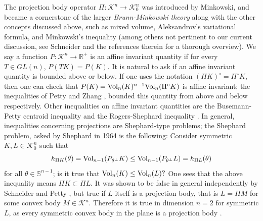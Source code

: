 \documentclass[11pt]{amsart}
\theoremstyle{definition}
\theoremstyle{remark}
\numberwithin{equation}{section}
\newcommand{\R}{\mathbb{R}}
\newcommand{\s}{\mathbb{S}}
\newcommand{\conbod}{\mathcal{K}^n}
\newcommand{\vol}{\text{\rm Vol}}
\begin{document}
The projection body operator $\Pi:\conbod\to\conbod_0$ was introduced by Minkowski, and became a cornerstone of the larger \textit{Brunn-Minkowski theory} along with the other concepts discussed above, such as mixed volume, Aleksandrov's variational formula, and Minkowski's inequality (among others not pertinent to our current discussion, see Schneider \cite{Sh1} and the references therein for a thorough overview). We say a function $P:\conbod\to \R^+$ is an affine invariant quantity if for every $T\in GL(n)$, $P(TK)=P(K)$. It is natural to ask if an affine invariant quantity is bounded above or below. If one uses the notation $(\Pi K)^\circ = \Pi^\circ K$, then one can check that $P(K)=\vol_n(K)^{n-1}\vol_n(\Pi^\circ K)$ is affine invariant; the inequalities of Petty \cite{CMP71} and Zhang \cite{Zhang91}, bounded this quantity from above and below respectively. Other inequalities on affine invariant quantities are the Busemann-Petty centroid inequality and the Rogers-Shephard inequality \cite{RS57}. In general, inequalities concerning projections are Shephard-type problems; the Shephard problem, asked by Shephard in 1964 \cite{She64} is the following: Consider symmetric $K,L\in\conbod_0$ such that $$h_{\Pi K}(\theta)=\vol_{n-1}(P_{\theta^{\perp}}K)\leq\vol_{n-1}(P_{\theta^{\perp}}L)=h_{\Pi L}(\theta)$$ for all $\theta\in\s^{n-1}$; is it true that $\vol_n(K)\leq \vol_n(L)?$ One sees that the above inequality means $\Pi K\subset \Pi L$. It was shown to be false in general independently by Schneider \cite{Sh2} and Petty \cite{CMP67}, but true if $L$ itself is a projection body, that is $L=\Pi M$ for some convex body $M\in\conbod.$ Therefore it is true in dimension $n=2$ for symmetric $L$, as every symmetric convex body in the plane is a projection body \cite{gardner_book}. 
\end{document}
